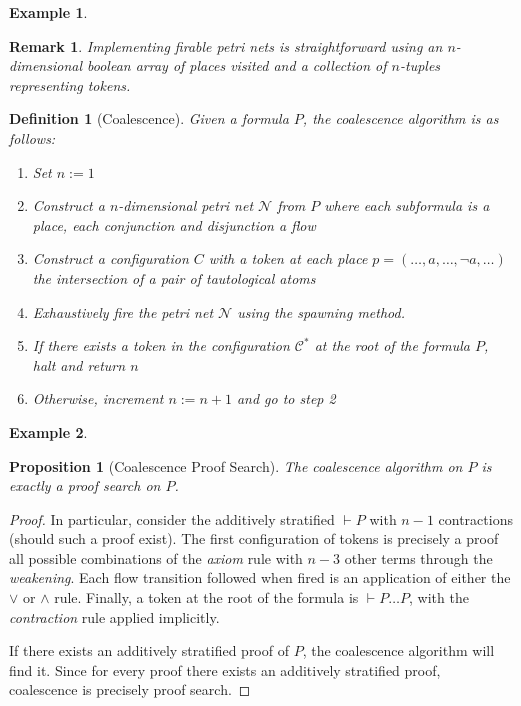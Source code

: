 \documentclass{article}
\def\seteq{:=}
\theoremstyle{indented}
\newtheorem{definition}[sec-ctr]{Definition}
\newtheorem{proposition}[sec-ctr]{Proposition}
\newtheorem*{example*}{Example}
\newtheorem{remark}[sec-ctr]{Remark}
\begin{document}
        \begin{example*}
        \end{example*}

        \begin{remark}
            Implementing firable petri nets is straightforward using an $n$-dimensional boolean array of places visited and a collection of $n$-tuples representing tokens.
        \end{remark}

        
        \begin{definition}[Coalescence]
            Given a formula $P$, the coalescence algorithm is as follows:
            \begin{enumerate}[noitemsep]
                \item Set  $n \seteq 1$
                \item Construct a $n$-dimensional petri net $\mathcal{N}$ from $P$ where each subformula is a place, each conjunction and disjunction a flow
                \item Construct a configuration $C$ with a token at each place $p = (\ldots, a, \ldots, \neg a, \ldots)$ the intersection of a pair of tautological atoms
                \item Exhaustively fire the petri net $\mathcal{N}$ using the \textit{spawning} method.
                \item If there exists a token in the configuration $\mathcal{C^*}$ at the root of the formula $P$, halt and return $n$
                \item Otherwise, increment $n \seteq n + 1$ and go to step 2
            \end{enumerate}
        \end{definition}

        \begin{example*}
        \end{example*}


        \begin{proposition}[Coalescence Proof Search]
            The coalescence algorithm on $P$ is exactly a proof search on $P$.
        \end{proposition}

        \begin{proof}
            In particular, consider the additively stratified $\vdash P$ with $n - 1$ contractions (should such a proof exist).
            The first configuration of tokens is precisely a proof all possible combinations of the \textit{axiom} rule with $n - 3$ other terms through the \textit{weakening}.
            Each flow transition followed when fired is an application of either the $\vee$ or $\wedge$ rule.
            Finally, a token at the root of the formula is $\vdash P \ldots P$, with the \textit{contraction} rule applied implicitly.

            If there exists an additively stratified proof of $P$, the coalescence algorithm will find it.
            Since for every proof there exists an additively stratified proof, coalescence is precisely proof search.
        \end{proof}
 
\end{document}
